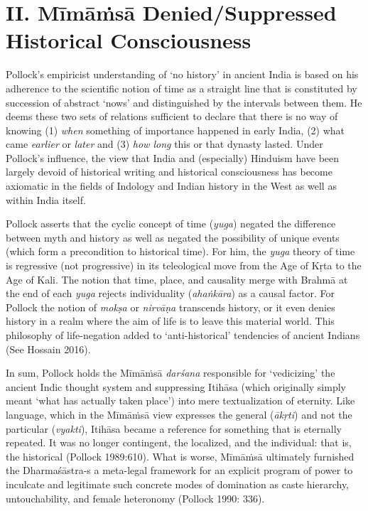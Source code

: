 \section*{II. Mīmāṁsā Denied/Suppressed Historical Consciousness}

Pollock’s empiricist understanding of ‘no history’ in ancient India is based on his adherence to the scientific notion of time as a straight line that is constituted by succession of abstract ‘nows’ and distinguished by the intervals between them. He deems these two sets of relations sufficient to declare that there is no way of knowing (1) \textit{when} something of importance happened in early India, (2) what came \textit{earlier }or \textit{later} and (3) \textit{how long} this or that dynasty lasted. Under Pollock’s influence, the view that India and (especially) Hinduism have been largely devoid of historical writing and historical consciousness has become axiomatic in the fields of Indology and Indian history in the West as well as within India itself.

Pollock asserts that the cyclic concept of time (\textit{yuga}) negated the difference between myth and history as well as negated the possibility of unique events (which form a precondition to historical time). For him, the \textit{yuga} theory of time is regressive (not progressive) in its teleological move from the Age of Kṛta to the Age of Kali. The notion that time, place, and causality merge with Brahmā at the end of each \textit{yuga} rejects individuality (\textit{ahaṅkāra}) as a causal factor. For Pollock the notion of \textit{mokṣa} or \textit{nirvāṇa} transcends history, or it even denies history in a realm where the aim of life is to leave this material world. This philosophy of life-negation added to ‘anti-historical’ tendencies of ancient Indians (See Hossain 2016).

In sum, Pollock holds the Mīmāṁsā \textit{darśana} responsible for ‘vedicizing’ the ancient Indic thought system and suppressing Itihāsa (which originally simply meant ‘what has actually taken place’) into mere textualization of eternity. Like language, which in the Mīmāṁsā view expresses the general (\textit{ākṛti}) and not the particular (\textit{vyakti}), Itihāsa became a reference for something that is eternally repeated. It was no longer contingent, the localized, and the individual: that is, the historical (Pollock 1989:610). What is worse, Mīmāṁsā ultimately furnished the Dharmaśāstra-s a meta-legal framework for an explicit program of power to inculcate and legitimate such concrete modes of domination as caste hierarchy, untouchability, and female heteronomy (Pollock 1990: 336).


